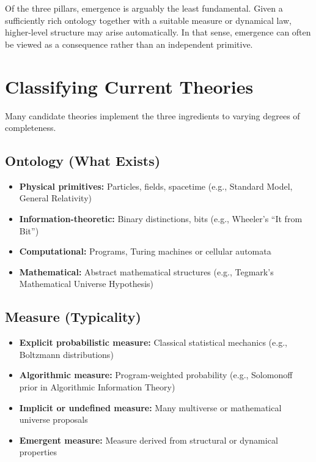 Of the three pillars, emergence is arguably the least fundamental.
Given a sufficiently rich ontology together with a suitable measure or dynamical law, higher-level structure may arise automatically.
In that sense, emergence can often be viewed as a consequence rather than an independent primitive.



\section{Classifying Current Theories}

Many candidate theories implement the three ingredients to varying degrees of completeness.

\subsection*{Ontology (What Exists)}
\begin{itemize}
    \item \textbf{Physical primitives:} Particles, fields, spacetime (e.g., Standard Model, General Relativity)
    \item \textbf{Information-theoretic:} Binary distinctions, bits (e.g., Wheeler's ``It from Bit'')
    \item \textbf{Computational:} Programs, Turing machines or cellular automata
    \item \textbf{Mathematical:} Abstract mathematical structures (e.g., Tegmark's Mathematical Universe Hypothesis)
\end{itemize}

\subsection*{Measure (Typicality)}
\begin{itemize}
    \item \textbf{Explicit probabilistic measure:} Classical statistical mechanics (e.g., Boltzmann distributions)
    \item \textbf{Algorithmic measure:} Program-weighted probability (e.g., Solomonoff prior in Algorithmic Information Theory)
    \item \textbf{Implicit or undefined measure:} Many multiverse or mathematical universe proposals
    \item \textbf{Emergent measure:} Measure derived from structural or dynamical properties
\end{itemize}

